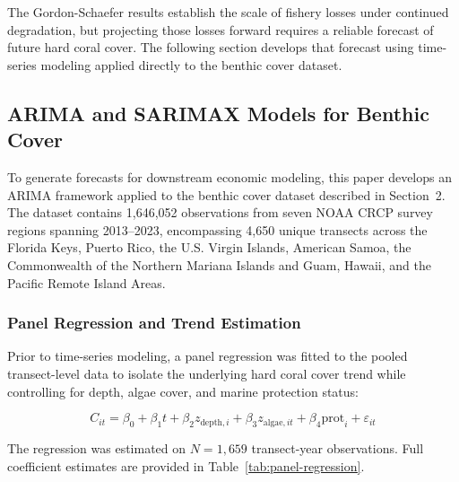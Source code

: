 \documentclass[10pt,letterpaper]{article}
\begin{document}
The Gordon-Schaefer results establish the scale of fishery losses under continued degradation, but projecting those losses forward requires a reliable forecast of future hard coral cover. The following section develops that forecast using time-series modeling applied directly to the benthic cover dataset.

\subsection{ARIMA and SARIMAX Models for Benthic Cover}

To generate forecasts for downstream economic modeling, this paper develops an ARIMA framework applied to the benthic cover dataset described in Section~2. The dataset contains 1,646,052 observations from seven NOAA CRCP survey regions spanning 2013--2023, encompassing 4,650 unique transects across the Florida Keys, Puerto Rico, the U.S. Virgin Islands, American Samoa, the Commonwealth of the Northern Mariana Islands and Guam, Hawaii, and the Pacific Remote Island Areas.

\subsubsection{Panel Regression and Trend Estimation}

Prior to time-series modeling, a panel regression was fitted to the pooled transect-level data to isolate the underlying hard coral cover trend while controlling for depth, algae cover, and marine protection status:

\begin{equation}
C_{it} = \beta_0 + \beta_1 t + \beta_2 z_{\text{depth},i} + \beta_3 z_{\text{algae},it} + \beta_4 \text{prot}_{i} + \varepsilon_{it}
\end{equation}

The regression was estimated on $N = 1{,}659$ transect-year observations. Full coefficient estimates are provided in Table~\ref{tab:panel-regression}.
\end{document}
